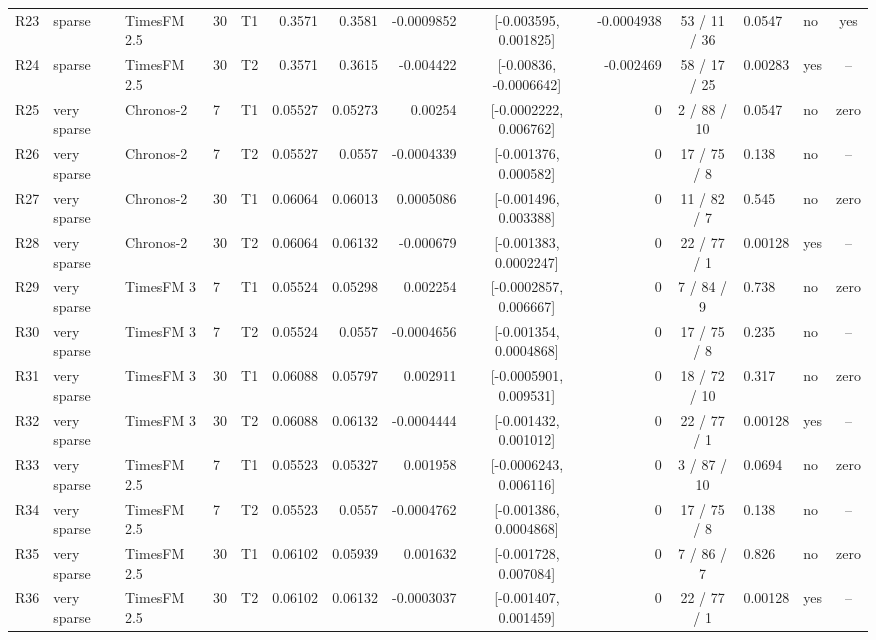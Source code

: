 \begin{table}[t]
\begin{tabular}{llllcrrrcrcllc}
R23 & sparse & TimesFM 2.5 & 30 & T1 & 0.3571 & 0.3581 & -0.0009852 & [-0.003595, 0.001825] & -0.0004938 & 53 / 11 / 36 & 0.0547 & no & yes \\
R24 & sparse & TimesFM 2.5 & 30 & T2 & 0.3571 & 0.3615 & -0.004422 & [-0.00836, -0.0006642] & -0.002469 & 58 / 17 / 25 & 0.00283 & yes & -- \\
R25 & very sparse & Chronos-2 & 7 & T1 & 0.05527 & 0.05273 & 0.00254 & [-0.0002222, 0.006762] & 0 & 2 / 88 / 10 & 0.0547 & no & zero \\
R26 & very sparse & Chronos-2 & 7 & T2 & 0.05527 & 0.0557 & -0.0004339 & [-0.001376, 0.000582] & 0 & 17 / 75 / 8 & 0.138 & no & -- \\
R27 & very sparse & Chronos-2 & 30 & T1 & 0.06064 & 0.06013 & 0.0005086 & [-0.001496, 0.003388] & 0 & 11 / 82 / 7 & 0.545 & no & zero \\
R28 & very sparse & Chronos-2 & 30 & T2 & 0.06064 & 0.06132 & -0.000679 & [-0.001383, 0.0002247] & 0 & 22 / 77 / 1 & 0.00128 & yes & -- \\
R29 & very sparse & TimesFM 3 & 7 & T1 & 0.05524 & 0.05298 & 0.002254 & [-0.0002857, 0.006667] & 0 & 7 / 84 / 9 & 0.738 & no & zero \\
R30 & very sparse & TimesFM 3 & 7 & T2 & 0.05524 & 0.0557 & -0.0004656 & [-0.001354, 0.0004868] & 0 & 17 / 75 / 8 & 0.235 & no & -- \\
R31 & very sparse & TimesFM 3 & 30 & T1 & 0.06088 & 0.05797 & 0.002911 & [-0.0005901, 0.009531] & 0 & 18 / 72 / 10 & 0.317 & no & zero \\
R32 & very sparse & TimesFM 3 & 30 & T2 & 0.06088 & 0.06132 & -0.0004444 & [-0.001432, 0.001012] & 0 & 22 / 77 / 1 & 0.00128 & yes & -- \\
R33 & very sparse & TimesFM 2.5 & 7 & T1 & 0.05523 & 0.05327 & 0.001958 & [-0.0006243, 0.006116] & 0 & 3 / 87 / 10 & 0.0694 & no & zero \\
R34 & very sparse & TimesFM 2.5 & 7 & T2 & 0.05523 & 0.0557 & -0.0004762 & [-0.001386, 0.0004868] & 0 & 17 / 75 / 8 & 0.138 & no & -- \\
R35 & very sparse & TimesFM 2.5 & 30 & T1 & 0.06102 & 0.05939 & 0.001632 & [-0.001728, 0.007084] & 0 & 7 / 86 / 7 & 0.826 & no & zero \\
R36 & very sparse & TimesFM 2.5 & 30 & T2 & 0.06102 & 0.06132 & -0.0003037 & [-0.001407, 0.001459] & 0 & 22 / 77 / 1 & 0.00128 & yes & -- \\
\bottomrule
\end{tabular}
\end{table}

